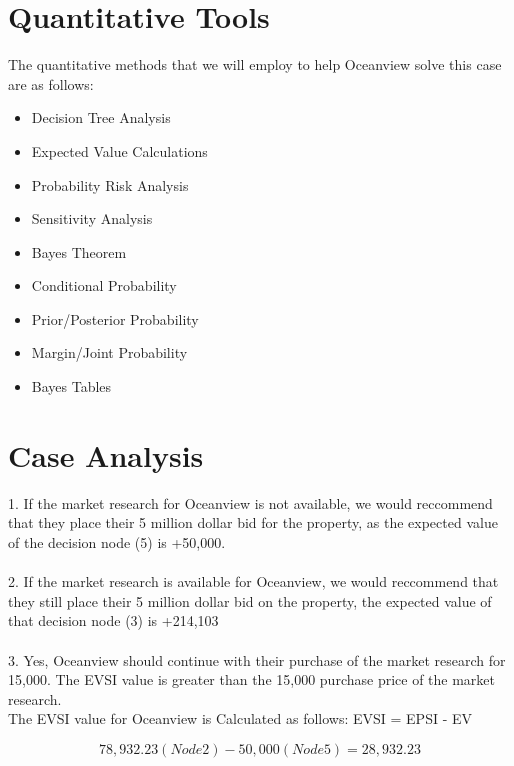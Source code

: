 \documentclass{article}
\begin{document}
\section*{Quantitative Tools}

The quantitative methods that we will employ to help Oceanview solve this case are as follows:

\begin{itemize}
    \item Decision Tree Analysis
    \item Expected Value Calculations
    \item Probability Risk Analysis
    \item Sensitivity Analysis
    \item Bayes Theorem
     \item Conditional Probability
     \item Prior/Posterior Probability
     \item Margin/Joint Probability
     \item Bayes Tables
\end{itemize}


\section{Case Analysis}
1. If the market research for Oceanview is not available, we would reccommend that they place their 5 million dollar bid for the property, as the expected value of the decision node (5) is +50,000. \\ \\
2. If the market research is available for Oceanview, we would reccommend that they still place their 5 million dollar bid on the property, the expected value of that decision node (3) is +214,103 \\ \\
3. Yes, Oceanview should continue with their purchase of the market research for 15,000. The EVSI value is greater than the 15,000 purchase price of the market research.\\
The EVSI value for Oceanview is Calculated as follows: EVSI = EPSI - EV

\[ 
78,932.23 (Node 2) - 50,000 (Node 5) = 28,932.23
\]
 \\ \\  \\ \\ \\ \\  \\  \\  \\ \\
\end{document}
